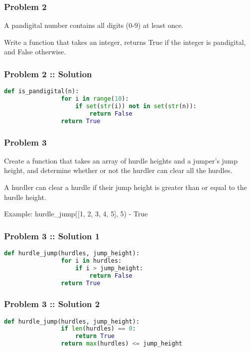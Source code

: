 \documentclass[14pt]{beamer}
\begin{document}
    \begin{frame}
        \frametitle{Problem 2}
        A pandigital number contains all digits (0-9) at least once. 

        \alert{Write a function that takes an integer, returns True if the integer is pandigital, and False otherwise.}
    \end{frame}

    \begin{frame}[containsverbatim]
        \frametitle{Problem 2 :: Solution }
        \begin{lstlisting}[language=Python]
            def is_pandigital(n):
                for i in range(10):
                    if set(str(i)) not in set(str(n)):
                        return False
                return True
        \end{lstlisting}
    \end{frame}
    \begin{frame}
        \frametitle{Problem 3}
        \alert{Create a function that takes an array of hurdle heights and a jumper's jump height, and determine whether or not the hurdler can clear all the hurdles.}

        A hurdler can clear a hurdle if their jump height is greater than or equal to the hurdle height.

        \alert{Example:} hurdle\_jump([1, 2, 3, 4, 5], 5) - True
    \end{frame}
    \begin{frame}[containsverbatim]
        \frametitle{Problem 3 :: Solution 1}
        \begin{lstlisting}[language=Python]
            def hurdle_jump(hurdles, jump_height):
                for i in hurdles:
                    if i > jump_height:
                        return False
                return True
        \end{lstlisting}
    \end{frame}
    \begin{frame}[containsverbatim]
        \frametitle{Problem 3 :: Solution 2}
        \begin{lstlisting}[language=Python]
            def hurdle_jump(hurdles, jump_height):
                if len(hurdles) == 0:
                    return True
                return max(hurdles) <= jump_height
        \end{lstlisting}
    \end{frame}
\end{document}
